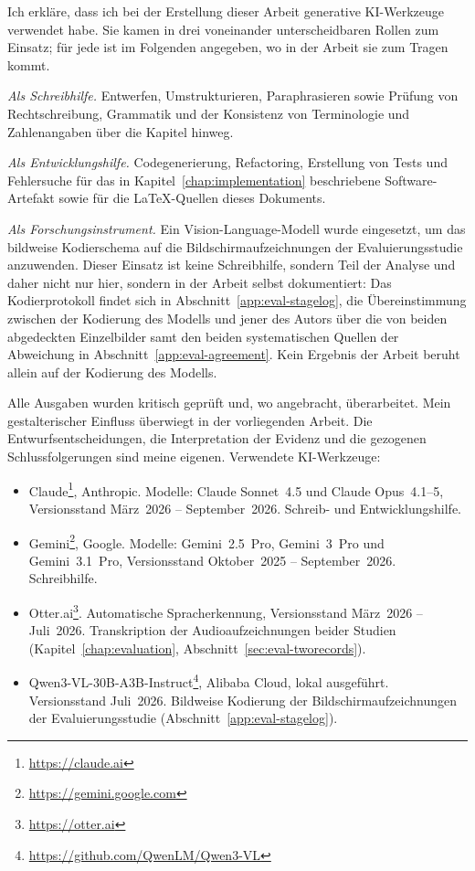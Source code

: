 Ich erkläre, dass ich bei der Erstellung dieser Arbeit generative KI-Werkzeuge
verwendet habe. Sie kamen in drei voneinander unterscheidbaren Rollen zum
Einsatz; für jede ist im Folgenden angegeben, wo in der Arbeit sie zum Tragen
kommt.

\emph{Als Schreibhilfe.} Entwerfen, Umstrukturieren, Paraphrasieren sowie
Prüfung von Rechtschreibung, Grammatik und der Konsistenz von Terminologie und
Zahlenangaben über die Kapitel hinweg.

\emph{Als Entwicklungshilfe.} Codegenerierung, Refactoring, Erstellung von Tests
und Fehlersuche für das in Kapitel~\ref{chap:implementation} beschriebene
Software-Artefakt sowie für die \LaTeX{}-Quellen dieses Dokuments.

\emph{Als Forschungsinstrument.} Ein Vision-Language-Modell wurde eingesetzt, um
das bildweise Kodierschema auf die Bildschirmaufzeichnungen der Evaluierungsstudie
anzuwenden. Dieser Einsatz ist keine Schreibhilfe, sondern Teil der Analyse und
daher nicht nur hier, sondern in der Arbeit selbst dokumentiert: Das
Kodierprotokoll findet sich in Abschnitt~\ref{app:eval-stagelog}, die
Übereinstimmung zwischen der Kodierung des Modells und jener des Autors über die
von beiden abgedeckten Einzelbilder samt den beiden systematischen Quellen der
Abweichung in Abschnitt~\ref{app:eval-agreement}. Kein Ergebnis der Arbeit beruht allein auf der Kodierung des Modells.

Alle Ausgaben wurden kritisch geprüft und, wo angebracht, überarbeitet. Mein
gestalterischer Einfluss überwiegt in der vorliegenden Arbeit. Die
Entwurfsentscheidungen, die Interpretation der Evidenz und die gezogenen
Schlussfolgerungen sind meine eigenen. Verwendete KI-Werkzeuge:

\begin{itemize}
  \item Claude\footnote{\url{https://claude.ai}}, Anthropic. Modelle: Claude
        Sonnet~4.5 und Claude Opus~4.1--5, Versionsstand März~2026 --
        September~2026. Schreib- und Entwicklungshilfe.
  \item Gemini\footnote{\url{https://gemini.google.com}}, Google. Modelle:
        Gemini~2.5~Pro, Gemini~3~Pro und Gemini~3.1~Pro, Versionsstand
        Oktober~2025 -- September~2026. Schreibhilfe.
  \item Otter.ai\footnote{\url{https://otter.ai}}. Automatische
        Spracherkennung, Versionsstand März~2026 -- Juli~2026. Transkription
        der Audioaufzeichnungen beider Studien
        (Kapitel~\ref{chap:evaluation}, Abschnitt~\ref{sec:eval-tworecords}).
  \item Qwen3-VL-30B-A3B-Instruct\footnote{\url{https://github.com/QwenLM/Qwen3-VL}},
        Alibaba Cloud, lokal ausgeführt. Versionsstand Juli~2026. Bildweise
        Kodierung der Bildschirmaufzeichnungen der Evaluierungsstudie
        (Abschnitt~\ref{app:eval-stagelog}).
\end{itemize}
